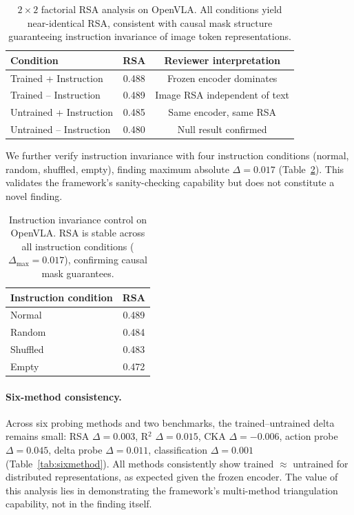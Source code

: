 \documentclass[letterpaper]{article}
\begin{document}
\begin{table}[t]
\centering
\caption{$2 \times 2$ factorial RSA analysis on OpenVLA. All conditions yield near-identical RSA, consistent with causal mask structure guaranteeing instruction invariance of image token representations.}
\label{tab:2x2}
\small
\begin{tabular}{lcc}
\toprule
\textbf{Condition} & \textbf{RSA} & \textbf{Reviewer interpretation} \\
\midrule
Trained + Instruction & 0.488 & Frozen encoder dominates \\
Trained -- Instruction & 0.489 & Image RSA independent of text \\
Untrained + Instruction & 0.485 & Same encoder, same RSA \\
Untrained -- Instruction & 0.480 & Null result confirmed \\
\bottomrule
\end{tabular}
\end{table}

We further verify instruction invariance with four instruction conditions (normal, random, shuffled, empty), finding maximum absolute $\Delta = 0.017$ (Table~\ref{tab:instcontrol}).
This validates the framework's sanity-checking capability but does not constitute a novel finding.

\begin{table}[t]
\centering
\caption{Instruction invariance control on OpenVLA. RSA is stable across all instruction conditions ($\Delta_{\max} = 0.017$), confirming causal mask guarantees.}
\label{tab:instcontrol}
\small
\begin{tabular}{lc}
\toprule
\textbf{Instruction condition} & \textbf{RSA} \\
\midrule
Normal & 0.489 \\
Random & 0.484 \\
Shuffled & 0.483 \\
Empty & 0.472 \\
\bottomrule
\end{tabular}
\end{table}

\paragraph{Six-method consistency.}
Across six probing methods and two benchmarks, the trained--untrained delta remains small: RSA $\Delta = 0.003$, R$^2$ $\Delta = 0.015$, CKA $\Delta = -0.006$, action probe $\Delta = 0.045$, delta probe $\Delta = 0.011$, classification $\Delta = 0.001$ (Table~\ref{tab:sixmethod}).
All methods consistently show trained $\approx$ untrained for distributed representations, as expected given the frozen encoder.
The value of this analysis lies in demonstrating the framework's multi-method triangulation capability, not in the finding itself.
\end{document}
